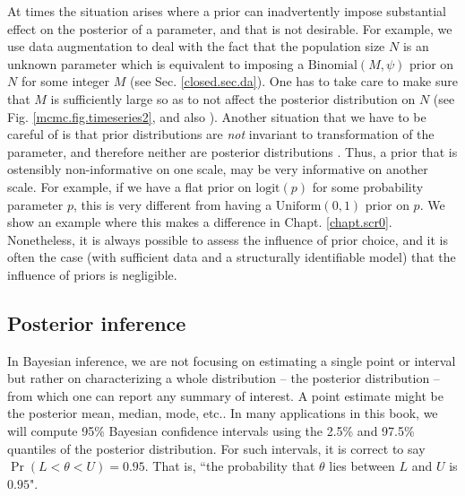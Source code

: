 At times the situation arises where a prior can inadvertently impose
substantial effect on the posterior of a parameter, and that is not desirable.
For example, we use data augmentation
to deal with the fact that the population size $N$ is an unknown parameter
 \citep{royle_etal:2007} which is equivalent to imposing a $\mbox{Binomial}(M,\psi)$
 prior on $N$ for some integer $M$ (see Sec. \ref{closed.sec.da}). One has to take care to make sure
 that $M$ is sufficiently large so as to not affect the posterior
 distribution on $N$ (see Fig. \ref{mcmc.fig.timeseries2}, and also
 \citet[][Ch. 5]{kery_schaub:2011}).
Another situation that we have
 to be careful of is that
prior 
distributions are {\it not} invariant to transformation of the
parameter,
and therefore neither are posterior distributions
\citep[][Sec. 6.2.1]{link_barker:2010}. Thus, a prior that is ostensibly
non-informative on one scale, may be very informative on another
scale. 
For example, if we have a flat prior on $\mbox{logit}(p)$ for some probability
parameter $p$, this is very different from having a 
$\mbox{Uniform}(0,1)$ prior 
on $p$. We show an example where this makes a difference in
Chapt. \ref{chapt.scr0}. Nonetheless, it is always possible to assess
the influence of prior choice, and it is often the case (with
sufficient data and a structurally identifiable model) that the
influence of priors is negligible. 

\subsection{Posterior inference}

In Bayesian inference, we are not focusing on estimating a single
point or interval but rather on characterizing a whole distribution --
the posterior distribution -- from which one can report any summary of
interest. A point estimate might be the posterior mean, median, mode,
etc..  In many applications in this book, we will compute 95\%
Bayesian confidence intervals using the 2.5\% and 97.5\% quantiles of the
posterior distribution. For such intervals, it is correct to say
$\Pr(L < \theta < U) = 0.95$. That is, ``the probability that $\theta$
lies between $L$ and $U$ is $0.95$". 

